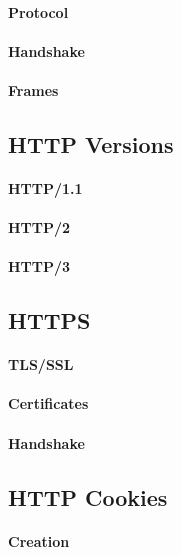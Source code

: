 \documentclass[a4paper]{article}
\begin{document}
        \paragraph{Protocol}
        \paragraph{Handshake}
        \paragraph{Frames}


        
    \subsection{HTTP Versions}
        \paragraph{HTTP/1.1}
        \paragraph{HTTP/2}
        \paragraph{HTTP/3}
        
    \subsection{HTTPS}
        \paragraph{TLS/SSL}
        \paragraph{Certificates}
        \paragraph{Handshake}

    \subsection{HTTP Cookies}
        \paragraph{Creation}
\end{document}
